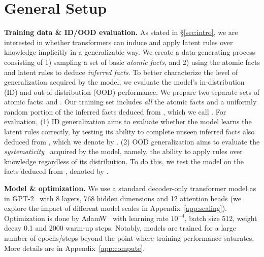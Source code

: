 
\section{General Setup}
\label{sec:general_setup}

\noindent\textbf{Training data \& ID/OOD evaluation.} As stated in \S\ref{sec:intro}, we are interested in whether transformers can induce and apply latent rules over knowledge implicitly in a generalizable way. We create a data-generating process consisting of 1) sampling a set of basic \textit{atomic facts}, and 2) using the atomic facts and latent rules to deduce \textit{inferred facts}. To better characterize the level of generalization acquired by the model, we evaluate the model's in-distribution (ID) and out-of-distribution (OOD) performance.
We prepare two separate sets of atomic facts:  and . Our training set includes \textit{all} the atomic facts and a uniformly random portion of the inferred facts deduced from , which we call . For evaluation, (1) ID generalization aims to evaluate whether the model learns the latent rules correctly, by testing its ability to complete unseen inferred facts also deduced from , which we denote by . (2) OOD generalization aims to evaluate the \textit{systematicity}~\citep{lake2018generalization} acquired by the model, namely, the ability to apply rules over knowledge regardless of its distribution. To do this, we test the model on the facts deduced from , denoted by .

\noindent\textbf{Model \& optimization.} We use a standard decoder-only transformer model as in GPT-2~\citep{radford2019language} with \num{8} layers, \num{768} hidden dimensions and \num{12} attention heads (we explore the impact of different model scales in Appendix~\ref{app:scaling}). Optimization is done by AdamW~\citep{loshchilov2018decoupled} with learning rate $10^{-4}$, batch size \num{512}, weight decay \num{0.1} and \num{2000} warm-up steps. Notably, models are trained for a large number of epochs/steps beyond the point where training performance saturates. More details are in Appendix~\ref{app:compute}.

